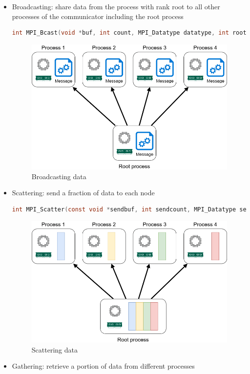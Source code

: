 \documentclass{article}
\begin{document}
\begin{itemize}
  \item Broadcasting: share data from the process with rank root to all other processes of the communicator including the root process
  \begin{lstlisting}[language=C]
    int MPI_Bcast(void *buf, int count, MPI_Datatype datatype, int root, MPI_Comm comm)
  \end{lstlisting}
  \begin{figure}[h!]
    \center
    \includegraphics[width=0.65\linewidth]{images/2022-08-30-13-54-28.png}
    \caption{Broadcasting data}
  \end{figure}
  \FloatBarrier
  \item Scattering: send a fraction of data to each node
  \begin{lstlisting}[language=C]
    int MPI_Scatter(const void *sendbuf, int sendcount, MPI_Datatype sendtype, void *recvbuf, int recvcount, MPI_Datatype recvtype, int root, MPI_Comm comm)
  \end{lstlisting}
  \begin{figure}[h!]
    \center
    \includegraphics[width=0.65\linewidth]{images/2022-08-30-14-03-58.png}
    \caption{Scattering data}
  \end{figure}
  \FloatBarrier
  \item Gathering: retrieve a portion of data from different processes
  \begin{lstlisting}[language=C]

\end{lstlisting}
\end{itemize}
\end{document}
